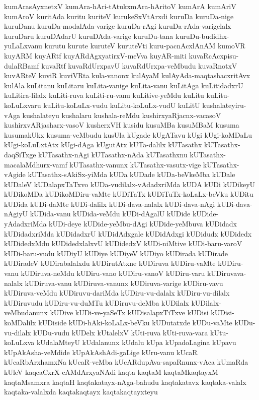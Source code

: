 {kumArasAyxnetxV
kumAra-hAri-tAtukxmAra-hAritoV
kumArA
kumAriV
kumAroV
kuritAda
kuritu
kuriteV
kurukeSxVtArxdi
kuruDa
kuruDa-nige
kuruDanu
kuruDa-modalAda-varige
kuruDa-rAgi
kuruDa-rAda-varigelalx
kuruDaru
kuruDAdarU
kuruDAda-varige
kuruDu-tana
kuruDu-budidhx-yuLaLxvanu
kurutu
kurute
kuruteV
kuruteVti
kuru-pacnAcxlAnAM
kumoVR
kuyARM
kuyARtf
kuyARdAgxyatirxV-meVva
kuyAR-miti
kuvaRcAcxpisu-dulaRBamf
kuvaRtf
kuvaRdUrxpavU
kuvaRdUrxpa-veMbudu
kuvaRnotxV
kuvARteV
kuviR
kuviVRta
kula-vanonx
kulAyaM
kulAyAda-maqtashacxritAvx
kulAla
kuLitanu
kuLitaru
kuLita-vanige
kuLita-vanu
kuLitAga
kuLitidadxrU
kuLitira-lilalx
kuLiti-ruva
kuLiti-ru-vanu
kuLitive-yeMdu
kuLitu
kuLitu-koLuLxvaru
kuLitu-koLuLx-vudu
kuLitu-koLuLx-vudU
kuLitU
kushalateyiru-vAga
kushalateyu
kushalaru
kushala-reMdu
kushirxyaRjacnx-vacasoV
kushirxvARjasharx-vasoV
kusherxVH
kusidu
kusuMBa
kusuMBaM
kusuma
kusumakUkx
kusuma-veMbudu
kusUla
kUgade
kUgATavu
kUgi
kUgi-koMDaLu
kUgi-koLuLxtAtx
kUgi-dAga
kUgutAtx
kUTa-dalilx
kUTasathx
kUTasathx-daqSiTxge
kUTasathx-nAgi
kUTasathx-nAda
kUTasathxnu
kUTasathx-macalaMdhurx-vamf
kUTasathx-vanunx
kUTasathx-vasutx-vige
kUTasathx-vAgide
kUTasathx-sAkiSx-yiMda
kUDa
kUDade
kUDa-beVkeMba
kUDale
kUDaleV
kUDalapxTaTxvo
kUDa-vudilalx-vAdadxriMda
kUDA
kUDi
kUDikeyU
kUDikoMDa
kUDikoMDiru-vaMte
kUDiTaTx
kUDiTuTx-koLaLx-beVku
kUDitu
kUDida
kUDi-daMte
kUDi-dalilx
kUDi-dava-nalalx
kUDi-dava-nAgi
kUDi-dava-nAgiyU
kUDida-vanu
kUDida-veMdu
kUDi-dAgalU
kUDide
kUDide-yAdadxriMda
kUDi-deye
kUDide-yeMbu-dAgi
kUDide-yeMbuva
kUDidadx
kUDidadxriMda
kUDidadxrU
kUDidAdxgale
kUDidAdxgi
kUDidudx
kUDidedx
kUDidedxMdu
kUDidedxlalxvU
kUDidedxV
kUDi-niMtive
kUDi-baru-varoV
kUDi-baru-vudu
kUDiyU
kUDiye
kUDiyeV
kUDiyo
kUDirada
kUDirade
kUDiradeV
kUDirabalalxdu
kUDirutAtxne
kUDiruva
kUDiru-vaMte
kUDiru-vanu
kUDiruva-neMdu
kUDiru-vano
kUDiru-vanoV
kUDiru-varu
kUDiruvava-nalalx
kUDiruva-vanu
kUDiruva-vanunx
kUDiruva-varige
kUDiru-vavu
kUDiruva-veMdu
kUDiruvu-dariMda
kUDiru-vu-dalalx
kUDiru-vu-dilalx
kUDiruvudu
kUDiru-vu-duMTu
kUDiruvu-deMba
kUDilalx
kUDilalx-veMbudanunx
kUDive
kUDi-ve-yaSeTx
kUDisalapxTiTxve
kUDisi
kUDisi-koMDalilx
kUDiside
kUDi-hAki-koLaLx-beVku
kUDutatxde
kUDu-vaMte
kUDu-vu-dilalx
kUDu-vudu
kUDelx
kUtalelxV
kUti-ruva
kUti-ruva-vara
kUtu-koLuLxva
kUdalaMteyU
kUdalanunx
kUdalu
kUpa
kUpadoLagina
kUpavu
kUpAkAsha-veMdide
kUpAkAshAdi-gaLige
kUru-vanu
kUcaR
kUcaRbArxhamxNa
kUcaR-veMba
kUcARdupAva-sapaRnunx-vAca
kUmaRda
kUleV
kaqcaCxrX-cAMdArxyaNAdi
kaqta
kaqtaM
kaqtaMkaqtayxM
kaqtaMsamxra
kaqtaH
kaqtakatayx-nAga-bahudu
kaqtakatavx
kaqtaka-valalx
kaqtaka-valalxda
kaqtakaqtayx
kaqtakaqtayxteyu
}

